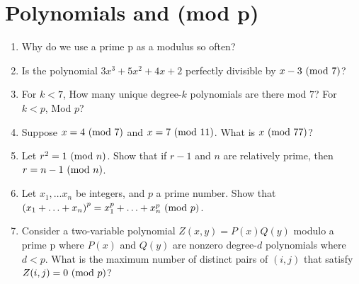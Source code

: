 \documentclass{article}
\begin{document}
    \section{Polynomials and (mod p)}
    \begin{enumerate}
        \item Why do we use a prime p as a modulus so often?
        \begin{solution}
        \end{solution}
        \item Is the polynomial $3 x^3 + 5x^2 + 4x + 2$ perfectly divisible by $x-3 \ (\textnormal{mod } 7)$?
        \begin{solution}
        \end{solution}
        \item For $k < 7$, How many unique degree-$k$ polynomials are there mod $7$? For $k < p$, Mod $p$?
        \begin{solution}
        \end{solution}
        \item Suppose $x=4 \textnormal{ (mod } 7 ) $ and $x=7 \textnormal{ (mod }11) $. What is $x \textnormal{ (mod }77)$?
        \begin{solution}
        \end{solution}
        \item Let $r^2 = 1 \textnormal{ (mod } n)$. Show that if $r-1$ and $n$ are relatively prime, then $r = n - 1 \textnormal{ (mod } n)$.
        \begin{solution}
        \end{solution}
        \item Let $x_1, \ldots x_n$ be integers, and $p$ a prime number. Show that $\left(x_1 + \ldots + x_n\right)^p = x_1^p + \ldots + x_n^p \textnormal{ (mod } p)$.
        \begin{solution}
        \end{solution}
        \item Consider a two-variable polynomial $Z(x,y)=P(x)Q(y)$ modulo a prime p where $P(x)$ and $Q(y)$ are nonzero degree-$d$ polynomials where $d < p$. What is the maximum number of distinct pairs of $(i, j)$ that satisfy $Z(i, j) = 0 \textnormal{ (mod } p)$?
        \begin{solution}
        \end{solution}
    \end{enumerate}
\end{document}
